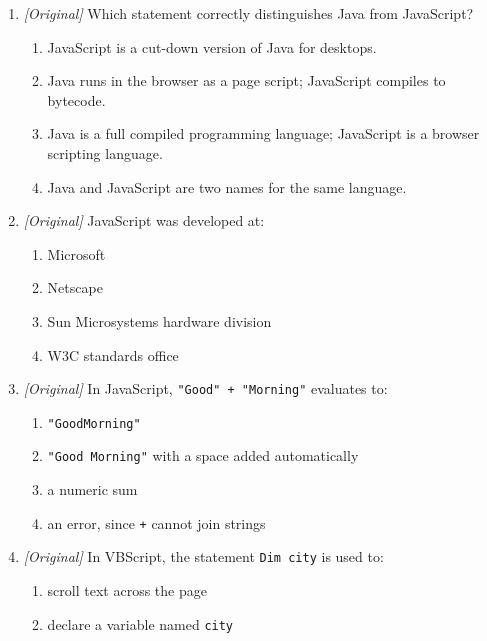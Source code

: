 \begin{enumerate}[label=\textbf{Q\arabic*.}, leftmargin=*]
\begin{enumerate}[label=\Alph*.]
    \item HTML structures and displays pages with a fixed tag set; XML carries data with user-defined tags.
    \item XML and HTML are identical in purpose and tag sets.
    \item HTML carries data between servers; XML renders pages in the browser.
  \end{enumerate}
\item \textit{[Original]} Which statement correctly distinguishes Java from
  JavaScript?
  \begin{enumerate}[label=\Alph*.]
    \item JavaScript is a cut-down version of Java for desktops.
    \item Java runs in the browser as a page script; JavaScript compiles to bytecode.
    \item Java is a full compiled programming language; JavaScript is a browser scripting language.
    \item Java and JavaScript are two names for the same language.
  \end{enumerate}
\item \textit{[Original]} JavaScript was developed at:
  \begin{enumerate}[label=\Alph*.]
    \item Microsoft
    \item Netscape
    \item Sun Microsystems hardware division
    \item W3C standards office
  \end{enumerate}
\item \textit{[Original]} In JavaScript, \texttt{"Good" + "Morning"} evaluates to:
  \begin{enumerate}[label=\Alph*.]
    \item \texttt{"GoodMorning"}
    \item \texttt{"Good Morning"} with a space added automatically
    \item a numeric sum
    \item an error, since \texttt{+} cannot join strings
  \end{enumerate}
\item \textit{[Original]} In VBScript, the statement \texttt{Dim city} is used to:
  \begin{enumerate}[label=\Alph*.]
    \item scroll text across the page
    \item declare a variable named \texttt{city}

\end{enumerate}
\end{enumerate}
